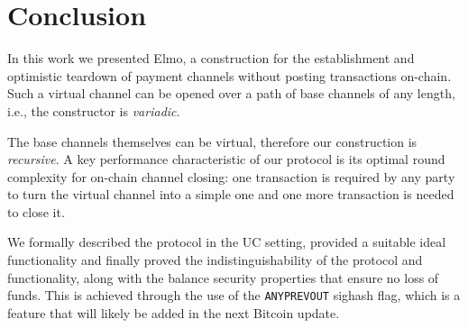 \section{Conclusion}

  In this work we presented Elmo, a
  construction for the establishment and optimistic teardown of
  payment channels without posting transactions on-chain.
  Such a virtual channel can be opened over a path of base channels of
  any length, i.e., the constructor is \emph{variadic}.

  The base channels themselves can be virtual, therefore our construction is
  \emph{recursive}. A key performance characteristic of our
  protocol is its optimal round complexity for on-chain channel
  closing: one transaction is required by any party to turn the
  virtual channel into a simple one and one more transaction is needed to close
  it.

  We formally described the protocol in the UC setting, provided a suitable
  ideal functionality and finally proved the indistinguishability
  of the protocol and functionality, along with the balance security properties
  that ensure no loss of funds. This is
  achieved through the use of the \texttt{ANYPREVOUT} sighash flag, which is a
  feature that will likely be added in the next Bitcoin update.
